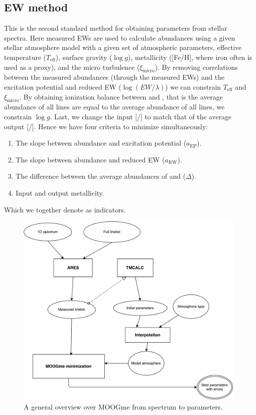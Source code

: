 \documentclass{aa}
\begin{document}
\subsection{EW method}
\label{sub:EW_method}
This is the second standard method for obtaining parameters from stellar
spectra. Here measured EWs are used to calculate abundances using a given
stellar atmosphere model with a given set of atmospheric parameters,
effective temperature ($T_\mathrm{eff}$), surface gravity ($\log g$),
metallicity ([Fe/H], where iron often is used as a proxy), and the micro
turbulence ($\xi_\mathrm{micro}$). By removing correlations between the measured
abundances (through the measured EWs) and the excitation potential and reduced
EW ($\log(EW/\lambda)$) we can constrain $T_\mathrm{eff}$ and $\xi_\mathrm{micro}$. By
obtaining ionization balance between  and , that is
the average abundance of all  lines are equal to the average
abundance of all  lines, we constrain $\log g$. Last, we change
the input [/] to match that of the average output
[/]. Hence we have four criteria to minimize simultaneously:

\begin{enumerate}
    \item The slope between abundance and excitation potential ($a_\mathrm{EP}$).
    \item The slope between abundance and reduced EW ($a_\mathrm{RW}$).
    \item The difference between the average abundances of  and
           ($\Delta$).
    \item Input and output metallicity.
\end{enumerate}

Which we together denote as indicators.

\begin{figure}[tpb]
    \centering
    \includegraphics[width=1.0\linewidth]{figures/MOOGme_general.pdf}
    \caption{A general overview over MOOGme from spectrum to parameters.}
    \label{fig:MOOGme_general}
\end{figure}
\end{document}
